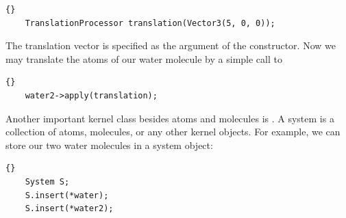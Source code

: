 \begin{lstlisting}{}
	TranslationProcessor translation(Vector3(5, 0, 0));
\end{lstlisting}
	
\noindent
The translation vector is specified as the argument of the constructor. Now we
may translate the atoms of our water molecule by a simple call to 

\begin{lstlisting}{}
	water2->apply(translation);
\end{lstlisting}

\noindent
Another important kernel class besides atoms and molecules is .
A system is a collection of atoms, molecules, or any other kernel objects. For
example, we can store our two water molecules in a system object:

\begin{lstlisting}{}
	System S;
	S.insert(*water);
	S.insert(*water2);
\end{lstlisting}

